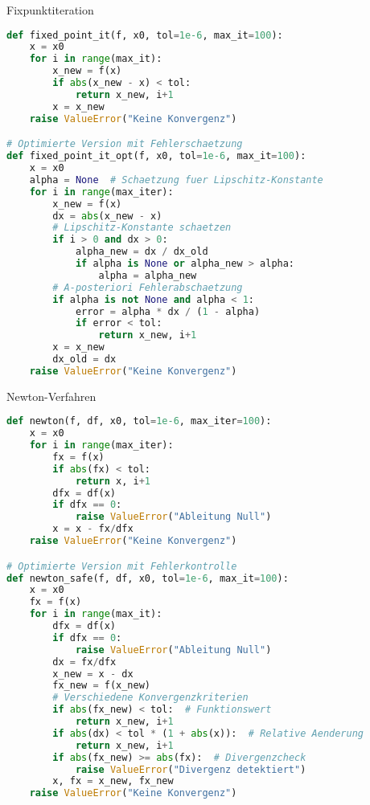 \begin{examplecode}{Fixpunktiteration}
\begin{lstlisting}[language=Python, style=basesmol]
def fixed_point_it(f, x0, tol=1e-6, max_it=100):
    x = x0
    for i in range(max_it):
        x_new = f(x)
        if abs(x_new - x) < tol:
            return x_new, i+1
        x = x_new
    raise ValueError("Keine Konvergenz")

# Optimierte Version mit Fehlerschaetzung
def fixed_point_it_opt(f, x0, tol=1e-6, max_it=100):
    x = x0
    alpha = None  # Schaetzung fuer Lipschitz-Konstante
    for i in range(max_iter):
        x_new = f(x)
        dx = abs(x_new - x)
        # Lipschitz-Konstante schaetzen
        if i > 0 and dx > 0:
            alpha_new = dx / dx_old
            if alpha is None or alpha_new > alpha:
                alpha = alpha_new
        # A-posteriori Fehlerabschaetzung
        if alpha is not None and alpha < 1:
            error = alpha * dx / (1 - alpha)
            if error < tol:
                return x_new, i+1
        x = x_new
        dx_old = dx
    raise ValueError("Keine Konvergenz")
\end{lstlisting}
\end{examplecode}

\begin{examplecode}{Newton-Verfahren}
\begin{lstlisting}[language=Python, style=basesmol]
def newton(f, df, x0, tol=1e-6, max_iter=100):
    x = x0
    for i in range(max_iter):
        fx = f(x)
        if abs(fx) < tol:
            return x, i+1
        dfx = df(x)
        if dfx == 0:
            raise ValueError("Ableitung Null")
        x = x - fx/dfx
    raise ValueError("Keine Konvergenz")

# Optimierte Version mit Fehlerkontrolle
def newton_safe(f, df, x0, tol=1e-6, max_it=100):
    x = x0
    fx = f(x)
    for i in range(max_it):
        dfx = df(x)
        if dfx == 0:
            raise ValueError("Ableitung Null")
        dx = fx/dfx
        x_new = x - dx
        fx_new = f(x_new)
        # Verschiedene Konvergenzkriterien
        if abs(fx_new) < tol:  # Funktionswert
            return x_new, i+1
        if abs(dx) < tol * (1 + abs(x)):  # Relative Aenderung
            return x_new, i+1
        if abs(fx_new) >= abs(fx):  # Divergenzcheck
            raise ValueError("Divergenz detektiert")
        x, fx = x_new, fx_new
    raise ValueError("Keine Konvergenz")
\end{lstlisting}
\end{examplecode}



